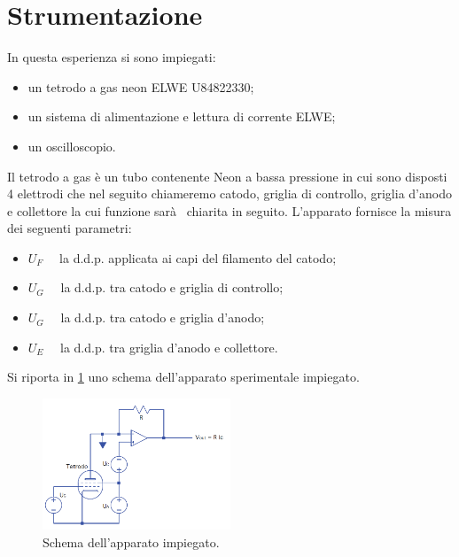 \section{Strumentazione}
	In questa esperienza si sono impiegati:	
	\begin{itemize}
	\item un tetrodo a gas neon ELWE U84822330;
	\item un sistema di alimentazione e 
		lettura di corrente ELWE;
	\item un oscilloscopio.
	\end{itemize}

Il tetrodo a gas è un tubo contenente Neon a bassa pressione in cui sono disposti 4 elettrodi che nel seguito chiameremo catodo, griglia di controllo, griglia d'anodo e collettore la cui funzione sarà  chiarita in seguito.
L'apparato fornisce la misura dei seguenti parametri:
\begin{itemize}
	\item $U_F\quad$	la d.d.p. applicata ai capi del filamento del catodo;
	\item $U_G\quad$	la d.d.p. tra catodo e griglia di controllo;
	\item $U_G\quad$	la d.d.p. tra catodo e griglia d'anodo;
	\item $U_E\quad$	la d.d.p. tra griglia d'anodo e collettore.
\end{itemize}

Si riporta in \figurename{ \ref{fig:apparato}} uno schema 
	dell'apparato sperimentale impiegato. 
	\begin{figure} [!h]
		\centering
		\includegraphics[width=0.5\textwidth]{../Figs-tabs/apparato.png}
		\caption{Schema dell'apparato impiegato.}
		\label{fig:apparato}
	\end{figure}

